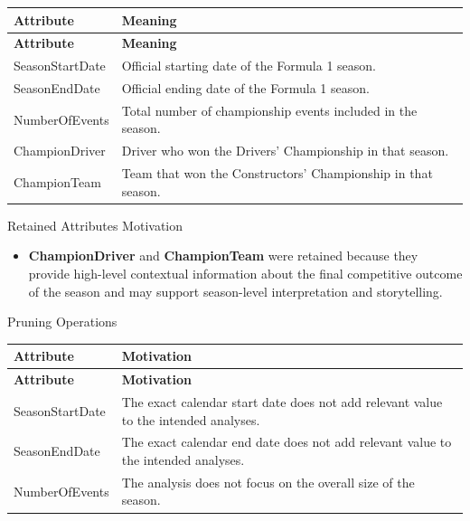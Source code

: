 \documentclass[a4paper,11pt]{article}
\begin{document}
	\begin{longtable}{|p{4cm}|p{10.8cm}|}
		\hline
		\textbf{Attribute} & \textbf{Meaning} \\
		\hline
		\endfirsthead
		
		\hline
		\textbf{Attribute} & \textbf{Meaning} \\
		\hline
		\endhead
		
		SeasonStartDate & Official starting date of the Formula 1 season. \\ \hline
		
		SeasonEndDate & Official ending date of the Formula 1 season. \\ \hline
		
		NumberOfEvents & Total number of championship events included in the season. \\ \hline
		
		ChampionDriver & Driver who won the Drivers' Championship in that season. \\ \hline
		
		ChampionTeam & Team that won the Constructors' Championship in that season. \\ \hline
		
	\end{longtable}
	
	Retained Attributes Motivation
	
	\begin{itemize}
		
		\item \textbf{ChampionDriver} and \textbf{ChampionTeam} were retained because they provide high-level contextual information about the final competitive outcome of the season and may support season-level interpretation and storytelling.
		
	\end{itemize}
		
	Pruning Operations
	
	\begin{longtable}{|p{4.4cm}|p{10.8cm}|}
		\hline
		\textbf{Attribute} & \textbf{Motivation} \\
		\hline
		\endfirsthead
		
		\hline
		\textbf{Attribute} & \textbf{Motivation} \\
		\hline
		\endhead
		
		SeasonStartDate & The exact calendar start date does not add relevant value to the intended analyses. \\ \hline
		
		SeasonEndDate & The exact calendar end date does not add relevant value to the intended analyses. \\ \hline
		
		NumberOfEvents & The analysis does not focus on the overall size of the season. \\ \hline
		
	\end{longtable}
	
\end{document}
